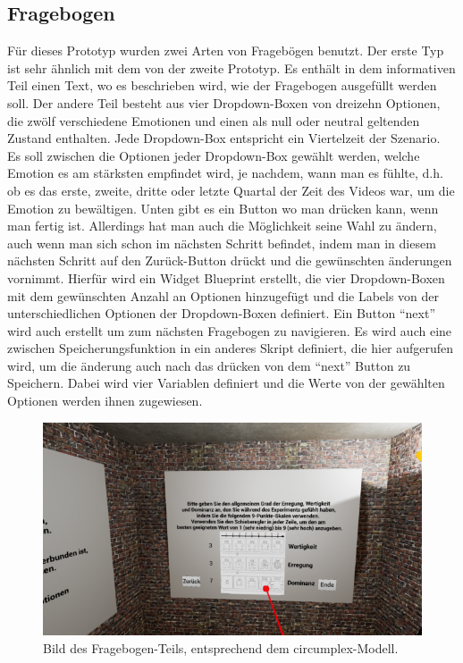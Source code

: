 \subsection{Fragebogen} \label{fragebogen-4}



F{\"u}r dieses Prototyp wurden zwei Arten von Frageb{\"o}gen benutzt. 
Der erste Typ ist sehr {\"a}hnlich mit dem von der zweite Prototyp. Es enth{\"a}lt in dem informativen Teil einen Text, wo es beschrieben wird, wie der Fragebogen ausgef{\"u}llt werden soll. Der andere Teil besteht aus vier Dropdown-Boxen von dreizehn Optionen, die zw{\"o}lf verschiedene Emotionen und einen als null oder neutral geltenden Zustand enthalten. Jede Dropdown-Box entspricht ein Viertelzeit der Szenario. Es soll zwischen die Optionen jeder Dropdown-Box gew{\"a}hlt werden, welche Emotion es am st{\"a}rksten empfindet wird, je nachdem, wann man es f{\"u}hlte, d.h. ob es das erste, zweite, dritte oder letzte Quartal der Zeit des Videos war, um die Emotion zu bew{\"a}ltigen. Unten gibt es ein Button wo man dr{\"u}cken kann, wenn man fertig ist. Allerdings hat man auch die M{\"o}glichkeit seine Wahl zu {\"a}ndern, auch wenn man sich schon im n{\"a}chsten Schritt befindet, indem man in diesem n{\"a}chsten Schritt auf den Zur{\"u}ck-Button dr{\"u}ckt und die gew{\"u}nschten {\"a}nderungen vornimmt. Hierf{\"u}r wird ein Widget Blueprint erstellt, die vier Dropdown-Boxen mit dem gew{\"u}nschten Anzahl an Optionen hinzugef{\"u}gt und die Labels von der unterschiedlichen Optionen der Dropdown-Boxen definiert. Ein Button ``next'' wird auch erstellt um zum n{\"a}chsten Fragebogen zu navigieren. Es wird auch eine zwischen Speicherungsfunktion in ein anderes Skript definiert, die hier aufgerufen wird, um die {\"a}nderung auch nach das dr{\"u}cken von dem ``next'' Button zu Speichern. Dabei wird vier Variablen definiert und die Werte von der gew{\"a}hlten Optionen werden ihnen zugewiesen. \\



\begin{figure}[H] \centering
\includegraphics[width=\textwidth]{Images/Fragebogen_3.png} 
\caption{ Bild des Fragebogen-Teils, entsprechend dem circumplex-Modell. } 
\label{fig:fragenbogen4} \end{figure}



